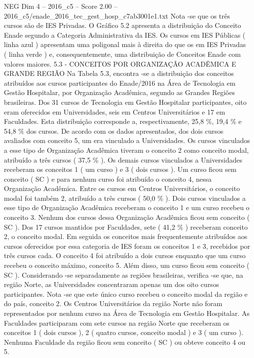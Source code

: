 \begin{textsample}{NEG Dim 4 – 2016\_c5 – Score 2.00 – 2016\_c5/enade\_2016\_tec\_gest\_hosp\_c7ab3001e1.txt}
Nota -se que os três cursos são de IES Privadas.
O Gráfico 5.2 apresenta a distribuição do Conceito Enade segundo a Categoria Administrativa da IES.
Os cursos em IES Públicas ( linha azul ) apresentam uma poligonal mais à direita do que os em IES Privadas ( linha verde ) e, consequentemente, uma distribuição de Conceitos Enade com valores maiores. 5.3 - CONCEITOS POR ORGANIZAÇÃO ACADÊMICA E GRANDE REGIÃO Na Tabela 5.3, encontra -se a distribuição dos conceitos atribuídos aos cursos participantes do Enade/2016 na Área de Tecnologia em Gestão Hospitalar, por Organização Acadêmica, segundo as Grandes Regiões brasileiras.
Dos 31 cursos de Tecnologia em Gestão Hospitalar participantes, oito eram oferecidos em Universidades, seis em Centros Universitários e 17 em Faculdades.
Esta distribuição corresponde a, respectivamente, 25,8 \%, 19,4 \% e 54,8 \% dos cursos.
De acordo com os dados apresentados, dos dois cursos avaliados com conceito 5, um era vinculado a Universidades.
Os cursos vinculados a esse tipo de Organização Acadêmica tiveram o conceito 2 como conceito modal, atribuído a três cursos ( 37,5 \% ).
Os demais cursos vinculados a Universidades receberam os conceitos 1 ( um curso ) e 3 ( dois cursos ).
Um curso ficou sem conceito ( SC ) e para nenhum curso foi atribuído o conceito 4, nessa Organização Acadêmica.
Entre os cursos em Centros Universitários, o conceito modal foi também 2, atribuído a três cursos ( 50,0 \% ).
Dois cursos vinculados a esse tipo de Organização Acadêmica receberam o conceito 1 e um curso recebeu o conceito 3.
Nenhum dos cursos dessa Organização Acadêmica ficou sem conceito ( SC ).
Dos 17 cursos mantidos por Faculdades, sete ( 41,2 \% ) receberam conceito 2, o conceito modal.
Em seguida os conceitos mais frequentemente atribuídos aos cursos oferecidos por essa categoria de IES foram os conceitos 1 e 3, recebidos por três cursos cada.
O conceito 4 foi atribuído a dois cursos enquanto que um curso recebeu o conceito máximo, conceito 5.
Além disso, um curso ficou sem conceito ( SC ).
Considerando -se separadamente as regiões brasileiras, verifica -se que, na região Norte, as Universidades concentraram apenas um dos oito cursos participantes.
Nota -se que este único curso recebeu o conceito modal da região e do país, conceito 2.
Os Centros Universitários da região Norte não foram representados por nenhum curso na Área de Tecnologia em Gestão Hospitalar.
As Faculdades participaram com sete cursos na região Norte que receberam os conceitos 1 ( dois cursos ), 2 ( quatro cursos, conceito modal ) e 3 ( um curso ).
Nenhuma Faculdade da região ficou sem conceito ( SC ) ou obteve conceito 4 ou 5.

\end{textsample}
